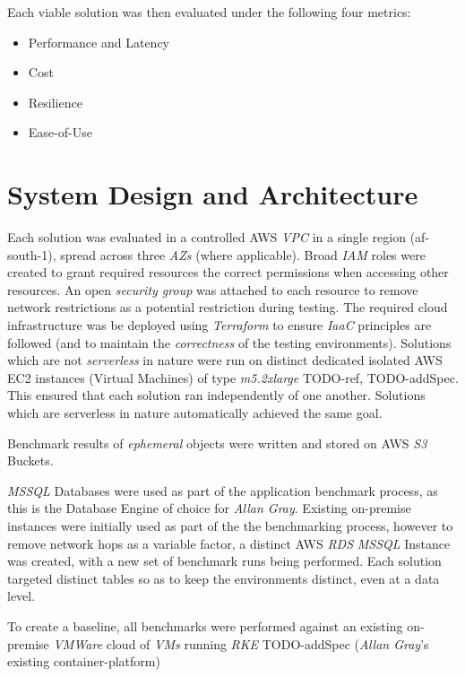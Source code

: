 \noindent \newline Each viable solution was then evaluated under the following four metrics:
\begin{itemize}
  \item Performance and Latency
  \item Cost
  \item Resilience
  \item Ease-of-Use
\end{itemize}

\chapter{System Design and Architecture}

Each solution was evaluated in a controlled AWS \emph{VPC} in a single region (af-south-1), spread across three \emph{AZs} (where applicable).
Broad \textit{IAM} roles were created to grant required resources the correct permissions when accessing other resources.
An open \textit{security group} was attached to each resource to remove network restrictions as a potential restriction during testing.
The required cloud infrastructure was be deployed using \emph{Terraform} to ensure \emph{IaaC} principles are followed (and to maintain the \emph{correctness} of the testing environments).
Solutions which are not \emph{serverless} in nature were run on distinct dedicated isolated AWS EC2 instances (Virtual Machines) of type \emph{m5.2xlarge} TODO-ref, TODO-addSpec. This ensured that each solution ran independently of one another.
Solutions which are serverless in nature automatically achieved the same goal.

Benchmark results of \emph{ephemeral} objects were written and stored on AWS \emph{S3} Buckets.

\emph{MSSQL} Databases were used as part of the application benchmark process, as this is the Database Engine of choice for \emph{Allan Gray}.
Existing on-premise instances were initially used as part of the the benchmarking process, however to remove network hops as a variable factor,
a distinct AWS \emph{RDS} \emph{MSSQL} Instance was created, with a new set of benchmark runs being performed.
Each solution targeted distinct tables so as to keep the environments distinct, even at a data level.

To create a baseline, all benchmarks were performed against an existing on-premise \emph{VMWare} cloud of \emph{VMs} running \emph{RKE} TODO-addSpec (\emph{Allan Gray}'s existing container-platform) \\

